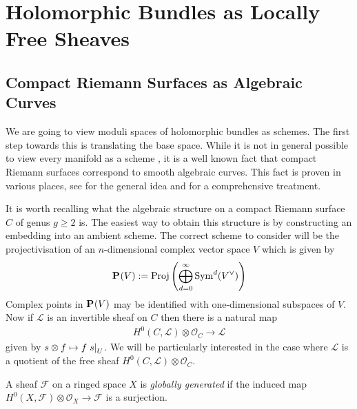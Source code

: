 \documentclass[12pt]{ociamthesis}  %
\begin{document}
\section{Holomorphic Bundles as Locally Free Sheaves}

\missingsection

\subsection{Compact Riemann Surfaces as Algebraic Curves}
\label{sec:surfaces_as_curves}

We are going to view moduli spaces of holomorphic bundles
as schemes. The first step towards this is translating the
base space. While it is not in general possible to view
every manifold as a scheme \missingcitation, it is a well
known fact that compact Riemann surfaces correspond to smooth
algebraic curves.
This fact is proven in various places, see \cite[215]{griffiths1994}
for the general idea and \cite[5-16]{harris2011}
for a comprehensive treatment.

It is worth recalling what the algebraic structure on a compact
Riemann surface $C$ of genus $g\geq 2$ is. The easiest way to obtain
this structure is by constructing an embedding into an ambient
scheme. The correct scheme to consider will be the projectivisation
of an $n$-dimensional complex vector space $V$ which is given
by
\begin{align*}
  \mathbf{P}^{}_{}(V) := \operatorname{Proj}\left({
        \bigoplus_{d=0}^\infty \operatorname{Sym}^d(V^\vee)
      }\right)
\end{align*}
Complex points in $\mathbf{P}^{}_{}(V)$ may be identified
with one-dimensional subspaces of $V$. \missingcitation
Now if $\mathscr L$ is
an invertible sheaf on $C$ then there is a natural map
\begin{align}\label{eq:natural_line_bundle_map}
  H^0(C,\mathscr L)\otimes\mathscr O_C \to \mathscr L
\end{align}
given by $s\otimes f \mapsto f\left.{s}\right\vert_{U}$. We will be
particularly interested in the case where $\mathscr L$ is a
quotient of the free sheaf $H^0(C,\mathscr L)\otimes\mathscr O_C$.

\begin{definition}
  A sheaf $\mathscr F$ on a ringed space $X$ is
  \emph{globally generated} if the induced map
  $H^0(X,\mathscr F) \otimes \mathscr O_X \to \mathscr F$
  is a surjection.
\end{definition}
\end{document}
